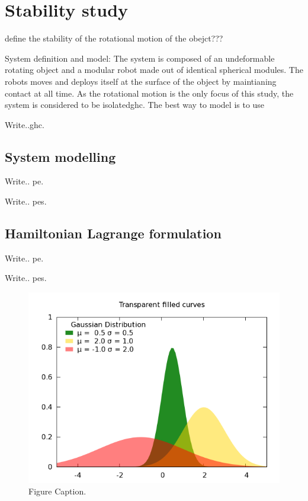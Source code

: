 

\chapter{Stability study}
\label{ch:Stability study}

define the stability of the rotational motion of the obejct???

System definition and model: The system is composed of an undeformable rotating object and a modular robot made out of identical spherical modules. The robots moves and deploys itself at the surface of the object by maintianing contact at all time. As the rotational motion is the only focus of this study, the system is considered to be isolated\gls{ghc}.
The best way to model is to use 

Write..\gls{ghc}.


\section{System modelling}
\label{System modelling}

Write.. \gls{pe}.

Write.. \glspl{pe}.

\section{Hamiltonian Lagrange formulation}
\label{Hamiltonian Lagrange formulation}

Write.. \gls{pe}.

Write.. \glspl{pe}.

\begin{figure}[h]
 \begin{center}
 \includegraphics [width=12cm]{Figures/Background/pic.png}
 \caption{Figure Caption.}
 \label{fig:label}
\end{center}
\end{figure} 

